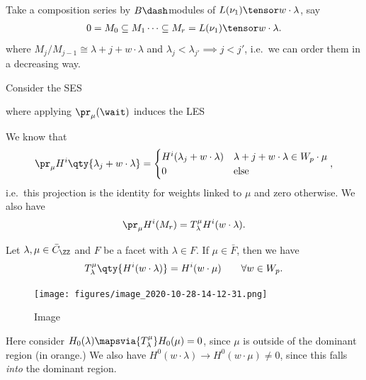 Take a composition series by \(B\dash\)modules of
\(L(\nu_1) \tensor w\cdot \lambda\), say
\begin{align*}  
0 = M_0 \subseteq M_1 \cdots \subseteq M_r = L(\nu_1) \tensor w\cdot \lambda
.\end{align*} where \(M_j / M_{j-1} \cong \lambda+j + w\cdot \lambda\)
and \(\lambda_j < \lambda_{j'} \implies j < j'\), i.e.~we can order them
in a decreasing way.

Consider the SES

\begin{center}\end{center}

where applying \(\pr_\mu(\wait)\) induces the LES

\begin{center}\end{center}

We know that
\begin{align*}  
\pr_\mu H^i\qty{\lambda_j + w\cdot \lambda} = 
\begin{cases}
H^i(\lambda_j + w\cdot \lambda ) & \lambda+j + w\cdot \lambda \in W_p\cdot \mu \\
0 & \text{else}
\end{cases}
,\end{align*} i.e.~this projection is the identity for weights linked to
\(\mu\) and zero otherwise. We also have
\begin{align*}  
\pr_\mu H^i(M_r) = T_\lambda^\mu H^i(w\cdot \lambda)
.\end{align*}

\begin{theorem}[?]

Let \(\lambda, \mu \in \bar{C}_\ZZ\) and \(F\) be a facet with
\(\lambda \in F\). If \(\mu \in \bar{F}\), then we have
\begin{align*}  
T_\lambda^\mu\qty{H^i(w\cdot \lambda)} = H^i(w\cdot \mu) \qquad \forall w\in W_p
.\end{align*}

\end{theorem}

\begin{example}[?]

\begin{figure}
\centering
\texttt{[image: figures/image\_2020-10-28-14-12-31.png]}
\caption{Image}
\end{figure}

Here consider \(H_0(\lambda) \mapsvia{T_\lambda^\mu} H_0(\mu) = 0\),
since \(\mu\) is outside of the dominant region (in orange.) We also
have \(H^0(w\cdot \lambda) \to H^0(w\cdot \mu) \neq 0\), since this
falls \emph{into} the dominant region.

\end{example}

